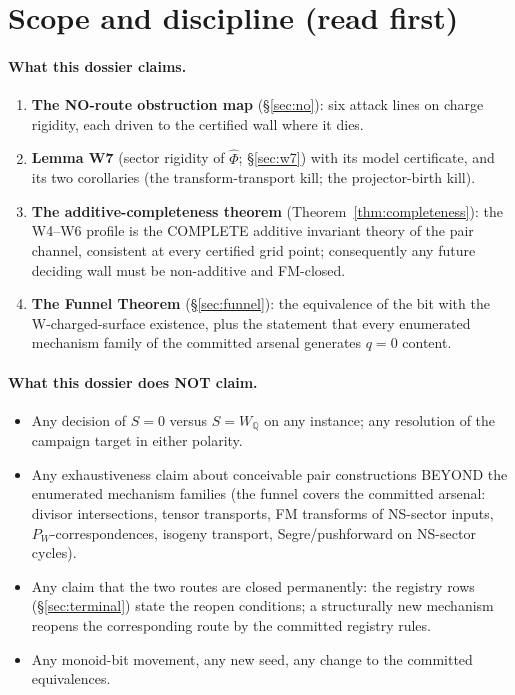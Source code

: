 \documentclass[11pt]{article}
\theoremstyle{definition}
\newcommand{\Q}{\mathbb{Q}}
\newcommand{\FMc}{\widehat\Phi}
\begin{document}
\section{Scope and discipline (read first)}\label{sec:scope}

\paragraph{What this dossier claims.}
\begin{enumerate}
\item \textbf{The NO-route obstruction map} (\S\ref{sec:no}): six attack lines
on charge rigidity, each driven to the certified wall where it dies.
\item \textbf{Lemma W7} (sector rigidity of $\FMc$; \S\ref{sec:w7}) with its
model certificate, and its two corollaries (the transform-transport kill; the
projector-birth kill).
\item \textbf{The additive-completeness theorem}
(Theorem~\ref{thm:completeness}): the W4--W6 profile is the COMPLETE additive
invariant theory of the pair channel, consistent at every certified grid
point; consequently any future deciding wall must be non-additive and
FM-closed.
\item \textbf{The Funnel Theorem} (\S\ref{sec:funnel}): the equivalence of the
bit with the W-charged-surface existence, plus the statement that every
enumerated mechanism family of the committed arsenal generates $q=0$ content.
\end{enumerate}

\paragraph{What this dossier does NOT claim.}
\begin{itemize}
\item Any decision of $S=0$ versus $S=W_\Q$ on any instance; any resolution of
the campaign target in either polarity.
\item Any exhaustiveness claim about conceivable pair constructions BEYOND the
enumerated mechanism families (the funnel covers the committed arsenal:
divisor intersections, tensor transports, FM transforms of NS-sector inputs,
$P_W$-correspondences, isogeny transport, Segre/pushforward on NS-sector
cycles).
\item Any claim that the two routes are closed permanently: the registry rows
(\S\ref{sec:terminal}) state the reopen conditions; a structurally new mechanism
reopens the corresponding route by the committed registry rules.
\item Any monoid-bit movement, any new seed, any change to the committed
equivalences.
\end{itemize}
\end{document}
